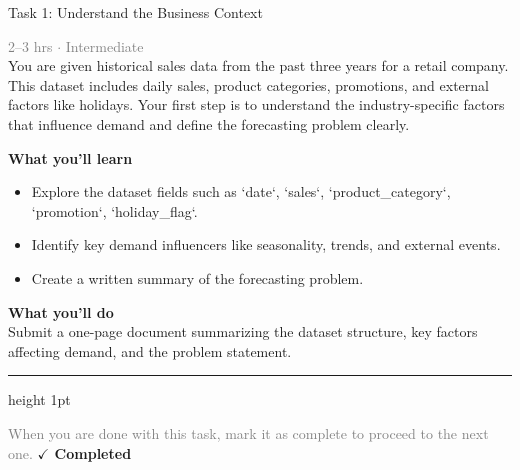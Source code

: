 \documentclass[10pt,a4paper]{article}
\begin{document}
\begin{taskbox}{Task 1: Understand the Business Context}

    {\small \textcolor{gray}{2--3 hrs $\cdot$ Intermediate}}\\[12pt]

      
You are given historical sales data from the past three years for a retail company. This dataset includes daily sales, product categories, promotions, and external factors like holidays. Your first step is to understand the industry-specific factors that influence demand and define the forecasting problem clearly.  


\vspace{8pt}
{\large \textbf{\textcolor{brandLight}{What you'll learn}}}\\[4pt]  
\begin{itemize}
    \item Explore the dataset fields such as `date`, `sales`, `product\_category`, `promotion`, `holiday\_flag`.
    \item Identify key demand influencers like seasonality, trends, and external events.  
    \item Create a written summary of the forecasting problem.  
\end{itemize}

\vspace{8pt}
{\large \textbf{\textcolor{brandLight}{What you'll do}}}\\[4pt]  
Submit a one-page document summarizing the dataset structure, key factors affecting demand, and the problem statement.\par

    \vspace{16pt}

    \textcolor{cardBorder}{\hrule height 1pt}\vspace{8pt}

    \small \textcolor{gray}{When you are done with this task, mark it as complete to proceed to the next one.} \hfill \textbf{\textcolor{brandDark}{$\checkmark$ Completed}}

\end{taskbox}
\end{document}
